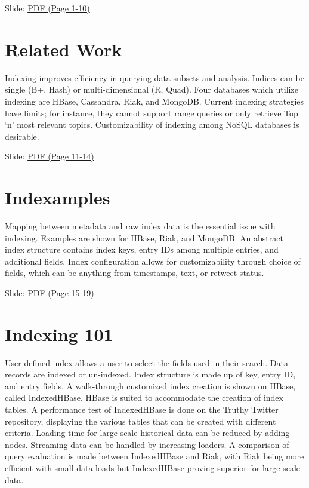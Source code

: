   Slide:
  \href{https://drive.google.com/open?id=0B88HKpainTSfWUh6dVNHcXloSnc}{PDF
  (Page 1-10)}

\section{Related Work}

Indexing improves efficiency in querying data subsets and analysis.
Indices can be single (B+, Hash) or multi-dimensional (R, Quad). Four
databases which utilize indexing are HBase, Cassandra, Riak, and
MongoDB. Current indexing strategies have limits; for instance, they
cannot support range queries or only retrieve Top `n' most relevant
topics. Customizability of indexing among NoSQL databases is desirable.


  Slide:
  \href{https://drive.google.com/open?id=0B88HKpainTSfWUh6dVNHcXloSnc}{PDF
  (Page 11-14)}

\section{Indexamples}

Mapping between metadata and raw index data is the essential issue with
indexing. Examples are shown for HBase, Riak, and MongoDB. An abstract
index structure contains index keys, entry IDs among multiple entries,
and additional fields. Index configuration allows for customizability
through choice of fields, which can be anything from timestamps, text,
or retweet status.


  Slide:
  \href{https://drive.google.com/open?id=0B88HKpainTSfWUh6dVNHcXloSnc}{PDF
  (Page 15-19)}

\section{Indexing 101}

User-defined index allows a user to select the fields used in their
search. Data records are indexed or un-indexed. Index structure is made
up of key, entry ID, and entry fields. A walk-through customized index
creation is shown on HBase, called IndexedHBase. HBase is suited to
accommodate the creation of index tables. A performance test of
IndexedHBase is done on the Truthy Twitter repository, displaying the
various tables that can be created with different criteria. Loading time
for large-scale historical data can be reduced by adding nodes.
Streaming data can be handled by increasing loaders. A comparison of
query evaluation is made between IndexedHBase and Riak, with Riak being
more efficient with small data loads but IndexedHBase proving superior
for large-scale data.

